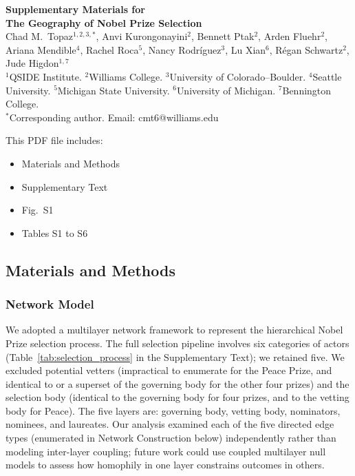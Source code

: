 \documentclass[12pt]{article}
\date{}
\def\scititle{The Geography of Nobel Prize Selection}
\begin{document}
\begin{center}
{\large\textbf{Supplementary Materials for}}\\[6pt]
{\large\textbf{\scititle}}\\[12pt]
Chad M.\ Topaz$^{1,2,3,\ast}$,
Anvi Kurongonayini$^{2}$,
Bennett Ptak$^{2}$,
Arden Fluehr$^{2}$,
Ariana Mendible$^{4}$,
Rachel Roca$^{5}$,
Nancy Rodr\'{i}guez$^{3}$,
Lu Xian$^{6}$,
R\'{e}gan Schwartz$^{2}$,
Jude Higdon$^{1,7}$\\[6pt]
{\small $^{1}$QSIDE Institute.
$^{2}$Williams College.
$^{3}$University of Colorado--Boulder.
$^{4}$Seattle University.
$^{5}$Michigan State University.
$^{6}$University of Michigan.
$^{7}$Bennington College.}\\[4pt]
{\small $^\ast$Corresponding author. Email: cmt6@williams.edu}
\end{center}

\bigskip

\noindent This PDF file includes:
\begin{itemize}
\item Materials and Methods
\item Supplementary Text
\item Fig.\ S1
\item Tables S1 to S6
\end{itemize}

\clearpage

\subsection*{Materials and Methods}

\subsubsection*{Network Model}

We adopted a multilayer network framework \cite{Kivela2014} to represent the hierarchical Nobel Prize selection process. The full selection pipeline involves six categories of actors (Table~\ref{tab:selection_process} in the Supplementary Text); we retained five. We excluded potential vetters (impractical to enumerate for the Peace Prize, and identical to or a superset of the governing body for the other four prizes) and the selection body (identical to the governing body for four prizes, and to the vetting body for Peace). The five layers are: governing body, vetting body, nominators, nominees, and laureates. Our analysis examined each of the five directed edge types (enumerated in Network Construction below) independently rather than modeling inter-layer coupling; future work could use coupled multilayer null models to assess how homophily in one layer constrains outcomes in others.
\end{document}

